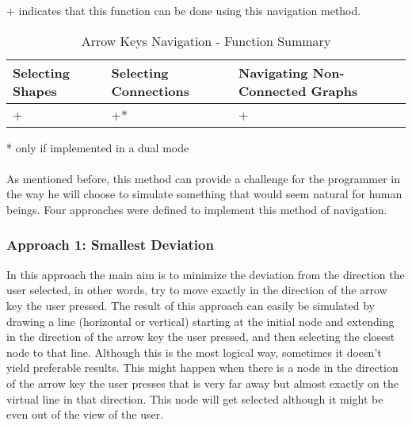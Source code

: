 \begin{table}[H]
\begin{center}
\begin{flushleft}
\footnotesize
{+ indicates that this function can be done using this navigation method.}\\
\end{flushleft}
	\begin{tabular}{| l | l | l |}
	\hline
	Selecting Shapes & Selecting Connections & Navigating Non-Connected Graphs \\ \hline
	+ & +* & + \\ \hline
	\end{tabular}
\begin{flushleft}
\footnotesize
{* only if implemented in a dual mode}
\end{flushleft} 
\caption{Arrow Keys Navigation - Function Summary}
\end{center}
\end{table}

\paragraph{}
As mentioned before, this method can provide a challenge for the programmer in the way he will choose to simulate something that would seem natural for human beings. Four approaches were defined to implement this method of navigation.


\subsubsection{Approach 1: Smallest Deviation}
In this approach the main aim is to minimize the deviation from the direction the user selected, in other words, try to move exactly in the direction of the arrow key the user pressed. The result of this approach can easily be simulated by drawing a line (horizontal or vertical) starting at the initial node and extending in the direction of the arrow key the user pressed, and then selecting the closest node to that line. Although this is the most logical way, sometimes it doesn't yield preferable results. This might happen when there is a node in the direction of the arrow key the user presses that is very far away but almost exactly on the virtual line in that direction. This node will get selected although it might be even out of the view of the user. %

